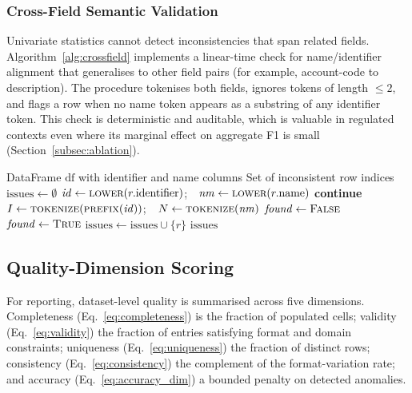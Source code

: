 \documentclass{ieeeaccess}
\begin{document}
\subsubsection{Cross-Field Semantic Validation}
Univariate statistics cannot detect inconsistencies that span related fields. Algorithm~\ref{alg:crossfield} implements a
linear-time check for name/identifier alignment that generalises to other field pairs (for example, account-code to
description). The procedure tokenises both fields, ignores tokens of length $\le 2$, and flags a row when no name token
appears as a substring of any identifier token. This check is deterministic and auditable, which is valuable in
regulated contexts even where its marginal effect on aggregate F1 is small (Section~\ref{subsec:ablation}).

\begin{algorithm}[tbp]
\caption{Cross-Field Consistency Check}
\label{alg:crossfield}
\begin{algorithmic}[1]
\Require DataFrame $\mathrm{df}$ with identifier and name columns
\Ensure Set of inconsistent row indices
\State $\mathrm{issues} \gets \emptyset$
    \State $\mathit{id} \gets \textsc{lower}(r.\mathrm{identifier})$;\ \ $\mathit{nm} \gets \textsc{lower}(r.\mathrm{name})$
     \State \textbf{continue} \EndIf
    \State $I \gets \textsc{tokenize}(\textsc{prefix}(\mathit{id}))$;\ \ $N \gets \textsc{tokenize}(\mathit{nm})$
    \State $\mathit{found} \gets \textsc{False}$
             \State $\mathit{found} \gets \textsc{True}$ \EndIf
        \EndFor
    \EndFor
     \State $\mathrm{issues} \gets \mathrm{issues} \cup \{r\}$ \EndIf
\EndFor
\State \Return $\mathrm{issues}$
\end{algorithmic}
\end{algorithm}

\subsection{Quality-Dimension Scoring}
For reporting, dataset-level quality is summarised across five dimensions. Completeness (Eq.~\ref{eq:completeness}) is the
fraction of populated cells; validity (Eq.~\ref{eq:validity}) the fraction of entries satisfying format and domain
constraints; uniqueness (Eq.~\ref{eq:uniqueness}) the fraction of distinct rows; consistency (Eq.~\ref{eq:consistency}) the
complement of the format-variation rate; and accuracy (Eq.~\ref{eq:accuracy_dim}) a bounded penalty on detected anomalies.
\end{document}
